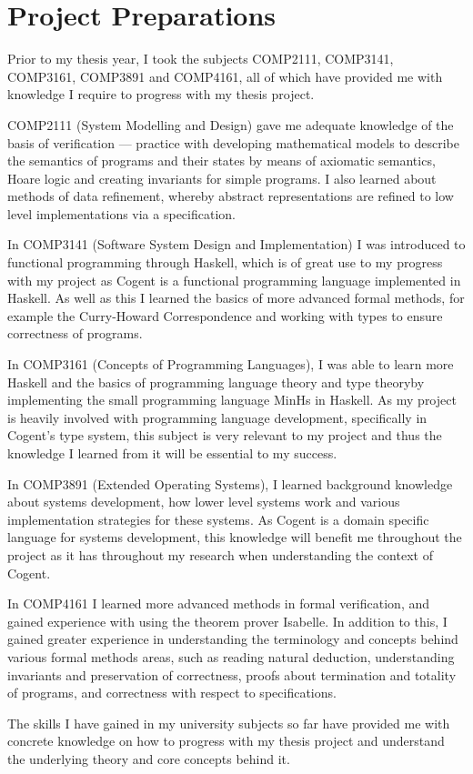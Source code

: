 \chapter{Project Preparations}\label{ch:conclusion}

Prior to my thesis year, I took the subjects COMP2111, COMP3141, COMP3161, COMP3891 and COMP4161,
all of which have provided me with knowledge I require to progress with my thesis project.

COMP2111 (System Modelling and Design) gave me adequate knowledge of the basis of verification 
--- practice with developing
mathematical models to describe the semantics of programs and their states by means of 
axiomatic semantics, Hoare logic and creating invariants for simple programs. I also 
learned about methods of data refinement, whereby abstract representations are refined to low
level implementations via a specification.

In COMP3141 (Software System Design and Implementation) I was introduced to functional 
programming through Haskell, which is of great
use to my progress with my project as Cogent is a functional programming language implemented in Haskell.
As well as this I learned the basics of more advanced formal methods, for example the Curry-Howard
Correspondence and working with types to ensure correctness of programs.

In COMP3161 (Concepts of Programming Languages), I was able to learn more Haskell and the
basics of programming language theory and type theoryby implementing the small programming 
language MinHs in Haskell. As my project is heavily involved with programming language development,
specifically in Cogent's type system, this subject is very relevant to my project and thus the knowledge
I learned from it will be essential to my success.

In COMP3891 (Extended Operating Systems), I learned background knowledge about systems development,
how lower level systems work and various implementation strategies for these systems. As Cogent
is a domain specific language for systems development, this knowledge will benefit me throughout
the project as it has throughout my research when understanding the context of Cogent.

In COMP4161 I learned more advanced methods in formal verification, and gained experience with using
the theorem prover Isabelle. In addition to this, I gained greater experience in understanding the 
terminology and concepts behind various formal methods areas, such as reading natural deduction,
understanding invariants and preservation of correctness, proofs about termination and totality
of programs, and correctness with respect to specifications.

The skills I have gained in my university subjects so far have provided me with concrete knowledge on
how to progress with my thesis project and understand the underlying theory and core concepts behind
it.
